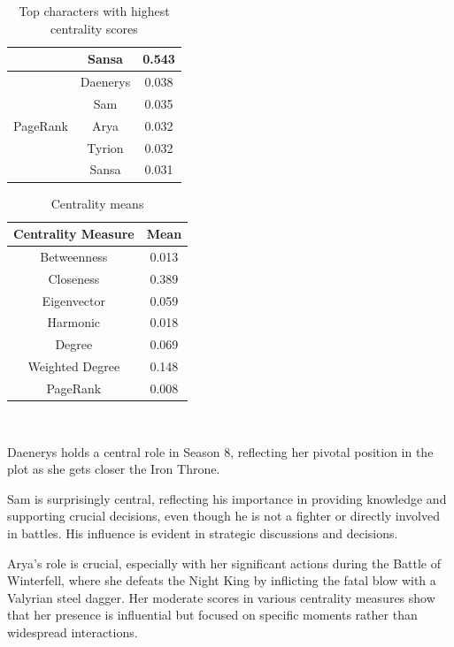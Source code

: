 \documentclass[10pt,twocolumn,letterpaper]{article}
\begin{document}
\begin{table}[!h]
\begin{tabular}{c|c|c}
                    & Sansa & 0.543 \\
        \hline
                    & Daenerys & 0.038 \\
                    & Sam & 0.035 \\
        PageRank    & Arya & 0.032 \\
                    & Tyrion & 0.032 \\
                    & Sansa & 0.031 \\
        \hline
    \end{tabular}
    \vspace{0.2cm}
    \caption{Top characters with highest centrality scores}
    \label{tab:my_label}
\end{table}


\begin{table}[!h]
    \centering
    \begin{tabular}{c|c}
        Centrality Measure & Mean  \\
        \hline
        Betweenness & 0.013 \\
        Closeness & 0.389 \\
        Eigenvector & 0.059 \\
        Harmonic & 0.018 \\
        Degree & 0.069 \\
        Weighted Degree & 0.148 \\
        PageRank & 0.008 \\
        \hline 
    \end{tabular} \\
    \caption{Centrality means}
    \label{tab:my_label}
\end{table}

Daenerys holds a central role in Season 8, reflecting her pivotal position in the plot as she gets closer the Iron Throne. 

Sam is surprisingly central, reflecting his importance in providing knowledge and supporting crucial decisions, even though he is not a fighter or directly involved in battles. His influence is evident in strategic discussions and decisions. 

Arya's role is crucial, especially with her significant actions during the Battle of Winterfell, where she defeats the Night King by inflicting the fatal blow with a Valyrian steel dagger. Her moderate scores in various centrality measures show that her presence is influential but focused on specific moments rather than widespread interactions.
\end{document}
